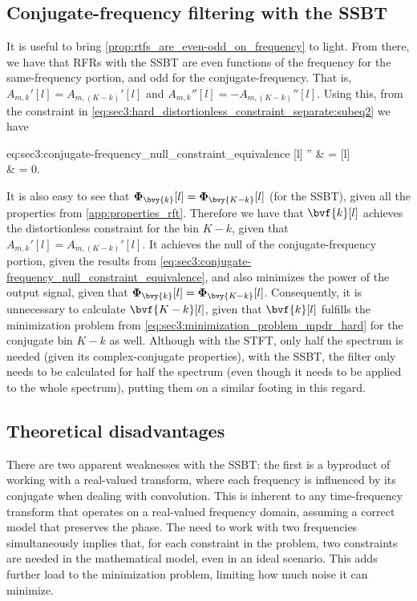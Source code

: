 \subsection{Conjugate-frequency filtering with the SSBT}
It is useful to bring \cref{prop:rtfs_are_even-odd_on_frequency} to light. From there, we have that RFRs with the SSBT are even functions of the frequency for the same-frequency portion, and odd for the conjugate-frequency. That is, $A_{m,k}'[l] = A_{m,(K-k)}'[l]$ and $A_{m,k}''[l] = -A_{m,(K-k)}''[l]$. Using this, from the constraint in \cref{eq:sec3:hard_distortionless_constraint_separate:subeq2} we have
\begin{equations}{eq:sec3:conjugate-frequency_null_constraint_equivalence}
	 ''
	& =   \\
	& = 0.
\end{equations}
It is also easy to see that $\Corr{\bvy{k}}[l] = \Corr{\bvy{K-k}}[l]$ (for the SSBT), given all the properties from \cref{app:properties_rft}. Therefore we have that $\bvf{k}[l]$ achieves the distortionless constraint for the bin $K-k$, given that $A_{m,k}'[l] = A_{m,(K-k)}'[l]$. It achieves the null of the conjugate-frequency portion, given the results from \cref{eq:sec3:conjugate-frequency_null_constraint_equivalence}, and also minimizes the power of the output signal, given that $\Corr{\bvy{k}}[l] = \Corr{\bvy{K-k}}[l]$. Consequently, it is unnecessary to calculate $\bvf{K-k}[l]$, given that $\bvf{k}[l]$ fulfills the minimization problem from \cref{eq:sec3:minimization_problem_mpdr_hard} for the conjugate bin $K-k$ as well. Although with the STFT, only half the spectrum is needed (given its complex-conjugate properties), with the SSBT, the filter only needs to be calculated for half the spectrum (even though it needs to be applied to the whole spectrum), putting them on a similar footing in this regard.

\subsection{Theoretical disadvantages}

There are two apparent weaknesses with the SSBT: the first is a byproduct of working with a real-valued transform, where each frequency is influenced by its conjugate when dealing with convolution. This is inherent to any time-frequency transform that operates on a real-valued frequency domain, assuming a correct model that preserves the phase. The need to work with two frequencies simultaneously implies that, for each constraint in the problem, two constraints are needed in the mathematical model, even in an ideal scenario. This adds further load to the minimization problem, limiting how much noise it can minimize.

